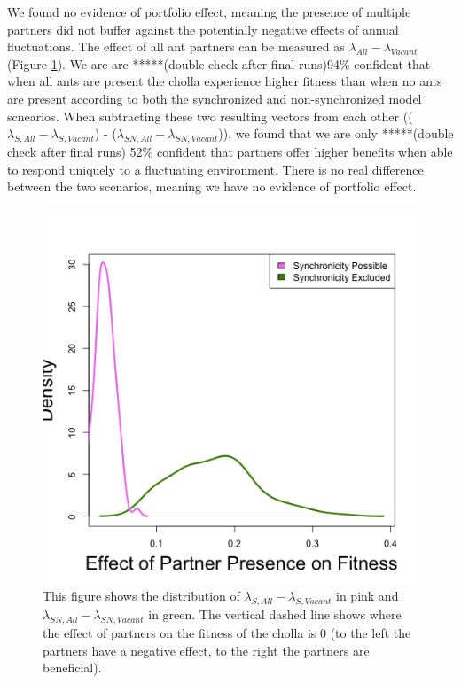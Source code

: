 \documentclass[11pt]{article}
\begin{document}
We found no evidence of portfolio effect, meaning the presence of multiple partners did not buffer against the potentially negative effects of annual fluctuations.
The effect of all ant partners can be measured as $\lambda_{All} - \lambda_{Vacant}$ (Figure \ref{fig:Portfolio}).
We are are *****(double check after final runs)94\% confident that when all ants are present the cholla experience higher fitness than when no ants are present according to both the synchronized and non-synchronized model scnearios. 
When subtracting these two resulting vectors from each other (($\lambda_{S,All} - \lambda_{S,Vacant}$) - ($\lambda_{SN,All} - \lambda_{SN,Vacant}$)), we found that we are only *****(double check after final runs) 52\% confident that partners offer higher benefits when able to respond uniquely to a fluctuating environment. 
There is no real difference between the two scenarios, meaning we have no evidence of portfolio effect.

\begin{figure}
	\includegraphics[width=\linewidth]{Figures/portfolio_effect.png}
	\caption{This figure shows the distribution of $\lambda_{S,All}-\lambda_{S,Vacant}$ in pink and $\lambda_{SN,All}-\lambda_{SN,Vacant}$ in green. The vertical dashed line shows where the effect of partners on the fitness of the cholla is 0 (to the left the partners have a negative effect, to the right the partners are beneficial).}
	\label{fig:Portfolio}
\end{figure}
\end{document}
